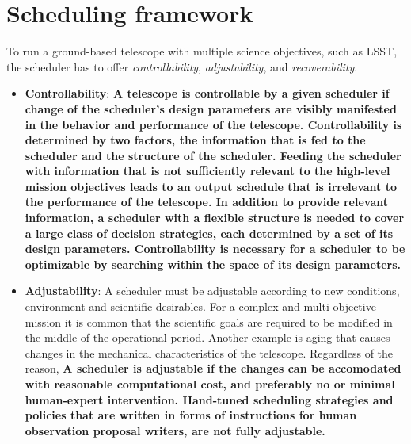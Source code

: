 \documentclass[12pt]{aastex62}
\theoremstyle{definition}
\begin{document}
\section{Scheduling framework}\label{sec_SM}
To run a ground-based telescope with multiple science objectives, such as LSST, the scheduler has to offer \textit{controllability}, \textit{adjustability}, and \textit{recoverability}.
\begin{itemize}
\item \textbf{Controllability}: {\bf A telescope is controllable by a given scheduler if change of the scheduler's design parameters are visibly manifested in the behavior and performance of the telescope. Controllability is determined by two factors, the information that is fed to the scheduler and the structure of the scheduler. Feeding the scheduler with information that is not sufficiently relevant to the high-level mission objectives leads to an output schedule that is irrelevant to the performance of the telescope. In addition to provide relevant information, a scheduler with a flexible structure is needed to cover a large class of decision strategies, each determined by a set of its design parameters. Controllability is necessary for a scheduler to be optimizable by searching within the space of its design parameters.\bf}

\item \textbf{Adjustability}: A scheduler must be adjustable according to new conditions, environment and scientific desirables. For a complex and multi-objective mission it is common that the scientific goals are required to be modified in the middle of the operational period. Another example is aging that causes changes in the mechanical characteristics of the telescope. Regardless of the reason, {\bf A scheduler is adjustable if the changes can be accomodated with reasonable computational cost, and preferably no or minimal human-expert intervention. Hand-tuned scheduling strategies and policies that are written in forms of instructions for human observation proposal writers, are not fully adjustable.\bf}


\end{itemize}
\end{document}
